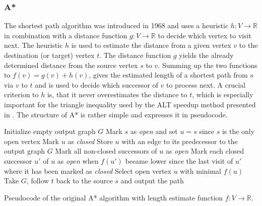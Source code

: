 		\subsubsection{A*}
		\label{subsubsec:astar}
		
			The  shortest path algorithm was introduced in 1968 and uses a heuristic $h : V \rightarrow \mathbb{R}$ in combination with a distance function $g : V \rightarrow \mathbb{R}$ to decide which vertex to visit next\cite{astar}.
			The heuristic $h$ is used to estimate the distance from a given vertex $v$ to the destination (or target) vertex $t$.
			The distance function $g$ yields the already determined distance from the source vertex $s$ to $v$.
			Summing up the two functions to $f(v) = g(v) + h(v)$, gives the estimated length of a shortest path from $s$ via $v$ to $t$ and is used to decide which successor of $v$ to process next.
			A crucial criterion to $h$ is, that it never overestimates the distance to $t$, which is especially important for the triangle inequality used by the ALT speedup method presented in .
			The structure of A* is rather simple and  expresses it in pseudocode.
			
			\begin{algorithm}[h]
				\begin{algorithmic}[1]
					\State Initialize empty output graph $G$
					\State Mark $s$ as \emph{open} and set $u = s$ since $s$ is the only open vertex
						\State Mark $u$ as \emph{closed}
						\State Store $u$ with an edge to its predecessor to the output graph $G$
						\State Mark all non-closed successors of $u$ as \emph{open} \label{alg:astar-open-1}
						\State Mark each closed successor $u'$ of $u$ as \emph{open} when $f(u')$ became lower since the last visit of $u'$ where it has been marked as \emph{closed} \label{alg:astar-open-2}
						\State Select open vertex $u$ with minimal $f(u)$
					\EndWhile
					\State Take $G$, follow $t$ back to the source $s$ and output the path
				\end{algorithmic}
				\caption{Pseudocode of the original A* algorithm\cite{astar} with length estimate function $f:V\rightarrow\mathbb{R}$.}
				\label{alg:astar}
			\end{algorithm}
			
